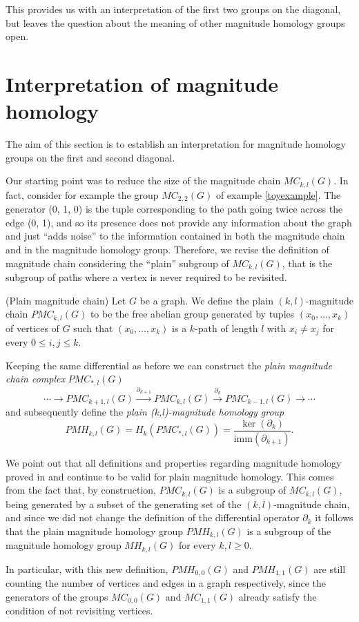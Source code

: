 \documentclass[runningheads]{llncs}
\newcommand{\imm}{\mathrm{imm}}
\begin{document}
This provides us with an interpretation of the first two groups on the diagonal, but leaves the question about the meaning of other magnitude homology groups open.

\section{Interpretation of magnitude homology}

The aim of this section is to establish an interpretation for magnitude homology groups on the first and second diagonal.

Our starting point was to reduce the size of the magnitude chain $MC_{k,l}(G)$. 
In fact, consider for example the group $MC_{2,2}(G)$ of example \ref{toyexample}.
The generator (0, 1, 0) is the tuple corresponding to the path going twice across the edge (0, 1), and so its presence does not provide any information about the graph and just ``adds noise'' to the information contained in both the magnitude chain and in the magnitude homology group.
Therefore, we revise the definition of magnitude chain considering the ``plain'' subgroup of $MC_{k,l}(G)$, that is the subgroup of paths where a vertex is never required to be revisited.

\begin{definition}(Plain magnitude chain)
Let $G$ be a graph.
We define the plain $(k,l)$-magnitude chain $PMC_{k,l}(G)$ to be the free abelian group generated by tuples $(x_0,\dots,x_k)$ of vertices of $G$ such that $(x_0,\dots,x_k)$ is a $k$-path of length $l$ with $x_i \neq x_j$ for every $0\leq i,j \leq k$.
\end{definition}

Keeping the same differential as before we can construct the \emph{plain magnitude chain complex} $PMC_{*,l}(G)$
\[
\cdots \to PMC_{k+1,l}(G) \xrightarrow{\partial_{k+1}} PMC_{k,l}(G) \xrightarrow{\partial_{k}} PMC_{k-1,l}(G) \to \cdots
\]
and subsequently define the \emph{plain (k,l)-magnitude homology group}
\[
PMH_{k,l}(G) = H_k(PMC_{*,l}(G)) = \frac{\ker(\partial_k)}{\imm(\partial_{k+1})}.
\]

\begin{remark}
\label{PMHsubgroup}
We point out that all definitions and properties regarding magnitude homology proved in \cite{hepworth2015categorifying} and \cite{leinster2021magnitude} continue to be valid for plain magnitude homology.
This comes from the fact that, by construction, $PMC_{k,l}(G)$ is a subgroup of $MC_{k,l}(G)$, being generated by a subset of the generating set of the $(k,l)$-magnitude chain, and since we did not change the definition of the differential operator $\partial_k$ it follows that the plain magnitude homology group $PMH_{k,l}(G)$ is a subgroup of the magnitude homology group $MH_{k,l}(G)$ for every $k,l\geq 0$.

In particular, with this new definition, $PMH_{0,0}(G)$ and $PMH_{1,1}(G)$ are still counting the number of vertices and edges in a graph respectively, since the generators of the groups $MC_{0,0}(G)$ and $MC_{1,1}(G)$ already satisfy the condition of not revisiting vertices.
\end{remark}
\end{document}
